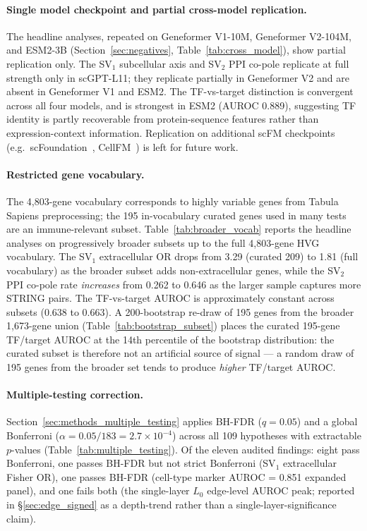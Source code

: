 \documentclass[12pt]{article}
\begin{document}
\paragraph{Single model checkpoint and partial cross-model replication.}
The headline analyses, repeated on Geneformer V1-10M, Geneformer V2-104M, and ESM2-3B (Section~\ref{sec:negatives}, Table~\ref{tab:cross_model}), show partial replication only.
The SV$_1$ subcellular axis and SV$_2$ PPI co-pole replicate at full strength only in scGPT-L11; they replicate partially in Geneformer V2 and are absent in Geneformer V1 and ESM2.
The TF-vs-target distinction is convergent across all four models, and is strongest in ESM2 (AUROC 0.889), suggesting TF identity is partly recoverable from protein-sequence features rather than expression-context information.
Replication on additional scFM checkpoints (e.g.\ scFoundation~\cite{hao2024scfoundation}, CellFM~\cite{zeng2025cellfm}) is left for future work.

\paragraph{Restricted gene vocabulary.}
The 4{,}803-gene vocabulary corresponds to highly variable genes from Tabula Sapiens preprocessing; the 195 in-vocabulary curated genes used in many tests are an immune-relevant subset.
Table~\ref{tab:broader_vocab} reports the headline analyses on progressively broader subsets up to the full 4{,}803-gene HVG vocabulary.
The SV$_1$ extracellular OR drops from 3.29 (curated 209) to 1.81 (full vocabulary) as the broader subset adds non-extracellular genes, while the SV$_2$ PPI co-pole rate \emph{increases} from 0.262 to 0.646 as the larger sample captures more STRING pairs.
The TF-vs-target AUROC is approximately constant across subsets (0.638 to 0.663).
A 200-bootstrap re-draw of 195 genes from the broader 1{,}673-gene union (Table~\ref{tab:bootstrap_subset}) places the curated 195-gene TF/target AUROC at the 14th percentile of the bootstrap distribution: the curated subset is therefore not an artificial source of signal --- a random draw of 195 genes from the broader set tends to produce \emph{higher} TF/target AUROC.

\paragraph{Multiple-testing correction.}
Section~\ref{sec:methods_multiple_testing} applies BH-FDR ($q = 0.05$) and a global Bonferroni ($\alpha = 0.05/183 = 2.7 \times 10^{-4}$) across all 109 hypotheses with extractable $p$-values (Table~\ref{tab:multiple_testing}).
Of the eleven audited findings: eight pass Bonferroni, one passes BH-FDR but not strict Bonferroni (SV$_1$ extracellular Fisher OR), one passes BH-FDR (cell-type marker AUROC = 0.851 expanded panel), and one fails both (the single-layer $L_0$ edge-level AUROC peak; reported in §\ref{sec:edge_signed} as a depth-trend rather than a single-layer-significance claim).
\end{document}
